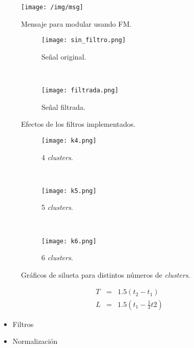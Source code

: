 \begin{figure}[H]
\begin{center}
	\texttt{[image: /img/msg]}
	\caption{Mensaje para modular usando FM.}
	\label{msg}
\end{center}
\end{figure}

\begin{figure}[H]
    \centering
    \begin{subfigure}[b]{0.45\textwidth}
            \texttt{[image: sin\_filtro.png]}
            \caption{Señal original.}
    \end{subfigure}%
    ~ 
    \begin{subfigure}[b]{0.45\textwidth}
            \texttt{[image: filtrada.png]}
            \caption{Señal filtrada.}
    \end{subfigure}
    \caption{Efectos de los filtros implementados.}
\end{figure}


\begin{figure}[H]
    \centering
    \begin{subfigure}[b]{0.3\textwidth}
            \texttt{[image: k4.png]}
            \caption{4 \textit{clusters}.}
    \end{subfigure}%
    ~ 
    \begin{subfigure}[b]{0.3\textwidth}
            \texttt{[image: k5.png]}
            \caption{5 \textit{clusters}.}
    \end{subfigure}
    ~ 
    \begin{subfigure}[b]{0.3\textwidth}
            \texttt{[image: k6.png]}
            \caption{6 \textit{clusters}.}
    \end{subfigure}
    \caption{Gráficos de silueta para distintos números de \textit{clusters}.}\label{fig-multi-sil}
\end{figure}

\begin{eqnarray}
T &=& 1.5(t_2 - t_1) \\
L  &=& 1.5(t_1 - \frac{1}{3}t2)
\end{eqnarray}

\begin{itemize}
\item Filtros
\item Normalización
\end{itemize}



